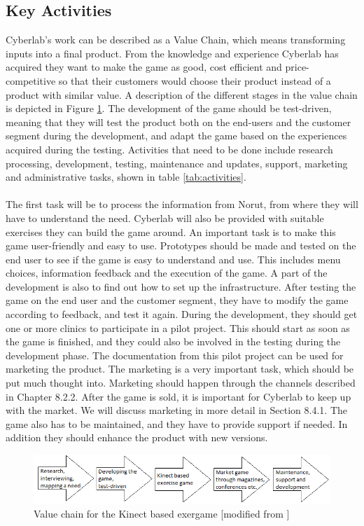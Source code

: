 \subsection{Key Activities}
Cyberlab's work can be described as a Value Chain, which means transforming inputs into a final product. From the knowledge and experience Cyberlab has acquired they want to make the game as good, cost efficient and price-competitive so that their customers would choose their product instead of a product with similar value. A description of the different stages in the value chain is depicted in Figure \ref{fig:ValueChainCase}. The development of the game should be test-driven, meaning that they will test the product both on the end-users and the customer segment during the development, and adapt the game based on the experiences acquired during the testing. Activities that need to be done include research processing, development, testing, maintenance and updates, support, marketing and administrative tasks, shown in table \ref{tab:activities}. \\ \\
The first task will be to process the information from Norut, from where they will have to understand the need. Cyberlab will also be provided with suitable exercises they can build the game around. An important task is to make this game user-friendly and easy to use. Prototypes should be made and tested on the end user to see if the game is easy to understand and use. This includes menu choices, information feedback and the execution of the game. A part of the development is also to find out how to set up the infrastructure. After testing the game on the end user and the customer segment, they have to modify the game according to feedback, and test it again. During the development, they should get one or more clinics to participate in a pilot project. This should start as soon as the game is finished, and they could also be involved in the testing during the development phase. The documentation from this pilot project can be used for marketing the product. The marketing is a very important task, which should be put much thought into. Marketing should happen through the channels described in Chapter 8.2.2.  After the game is sold, it is important for Cyberlab to keep up with the market. We will discuss marketing in more detail in Section 8.4.1. The game also has to be maintained, and they have to provide support if needed. In addition they should enhance the product with new versions.

\begin{figure}
\begin{center}
\includegraphics[scale=0.7]{valuechaincase}
\caption[Value Chain for the Kinect Based Exergame]{Value chain for the Kinect based exergame [modified from \cite{osterwalderthesis}]}
\label{fig:ValueChainCase}
\end{center}
\end{figure}

